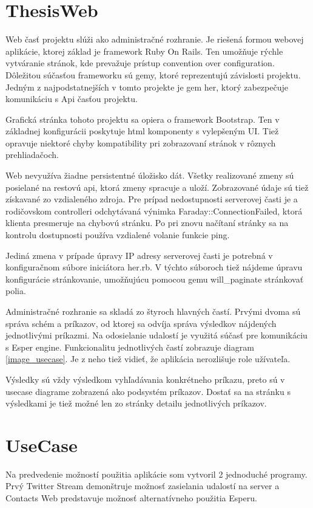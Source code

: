\section{ThesisWeb}
	Web časť projektu slúži ako administračné rozhranie. Je riešená formou webovej aplikácie, ktorej základ je framework Ruby On Rails. Ten umožňuje rýchle vytváranie stránok, kde prevažuje prístup convention over configuration. Dôležitou súčasťou frameworku sú gemy, ktoré reprezentujú závislosti projektu. Jedným z najpodstatnejších v tomto projekte je gem her, ktorý zabezpečuje komunikáciu s Api časťou projektu.
	
	
	Grafická stránka tohoto projektu sa opiera o framework Bootstrap. Ten v základnej konfigurácii poskytuje html komponenty s vylepšeným UI. Tiež opravuje niektoré chyby kompatibility pri zobrazovaní stránok v rôznych prehliadačoch.
	
	Web nevyužíva žiadne persistentné úložisko dát. Všetky realizované zmeny sú posielané na restovú api, ktorá zmeny spracuje a uloží. Zobrazované údaje sú tiež získavané zo vzdialeného zdroja.
	Pre prípad nedostupnosti serverovej časti je a rodičovskom controlleri odchytávaná výnimka Faraday::ConnectionFailed, ktorá klienta presmeruje na chybovú stránku. Po pri znovu načítaní stránky sa na kontrolu dostupnosti používa vzdialené volanie funkcie ping.
	
	Jediná zmena v prípade úpravy IP adresy serverovej časti je potrebná v konfiguračnom súbore iniciátora her.rb. V týchto súboroch tiež nájdeme úpravu konfigurácie stránkovanie, umožňujúcu pomocou gemu will\_paginate stránkovať polia.

	Administračné rozhranie sa skladá zo štyroch hlavných častí. Prvými dvoma sú správa schém a príkazov, od ktorej sa odvíja správa výsledkov nájdených jednotlivými príkazmi. Na odosielanie udalostí je využitá súčasť pre komunikáciu s Esper engine. Funkcionalitu jednotlivých častí zobrazuje diagram \ref{image_usecase}. Je z neho tiež vidieť, že aplikácia nerozlišuje role užívateľa.	
	
	Výsledky sú vždy výsledkom vyhľadávania konkrétneho príkazu, preto sú v usecase diagrame zobrazená ako podsystém príkazov. Dostať sa na stránku s výsledkami je tiež možné len zo stránky detailu jednotlivých príkazov.

\section{UseCase}
	Na predvedenie možností použitia aplikácie som vytvoril 2 jednoduché programy. Prvý Twitter Stream demonštruje možnosť zasielania udalostí na server a Contacts Web predstavuje možnosť alternatívneho použitia Esperu. 
	
